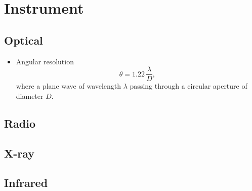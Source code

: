\chapter{Instrument}

\section{Optical}
\begin{itemize}
    \item Angular resolution
\begin{equation}
    \theta = 1.22\,\frac{\lambda}{D},
\end{equation}
where a plane wave of wavelength $\lambda$ passing through a circular aperture of diameter $D$. 
\end{itemize}
\section{Radio}
\section{X-ray}
\section{Infrared}

